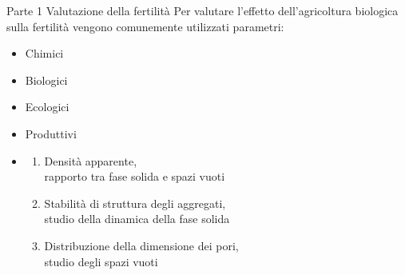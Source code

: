 \documentclass[xcolor={usenames, table, x11names}, final, 10pt]{beamer}
\begin{document}
\begin{frame}{Parte 1 \small{Valutazione della fertilità}}
  Per valutare l'effetto dell'agricoltura biologica sulla fertilità
  vengono comunemente utilizzati parametri:
  \begin{itemize}[<+->]
    \pause
  \item Chimici
  \item Biologici
  \item Ecologici
  \item Produttivi
  \item {}

    \begin{enumerate}[<+->]
      \pause
    \item  \large{Densità apparente},\\ \normalsize{rapporto tra fase
        solida e spazi vuoti}
      \vfill
    \item \large{Stabilità di struttura degli aggregati},\\
      \normalsize{studio della dinamica della fase solida} 
      \vfill
    \item  \large{Distribuzione della dimensione dei pori},\\ \normalsize{studio degli spazi vuoti}
    \end{enumerate}
  \end{itemize}
  
\end{frame}
\end{document}
